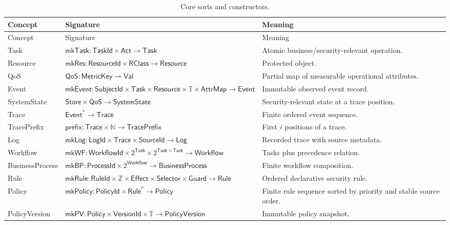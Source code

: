 \documentclass[11pt]{article}
\theoremstyle{remark}
\newcommand{\Nat}{\mathbb{N}}
\begin{document}
\begin{longtable}{>{\raggedright\arraybackslash}p{2.6cm} p{4.2cm} p{6.5cm}}
\caption{Core sorts and constructors.}\label{tab:sorts}\\
\toprule
Concept & Signature & Meaning \\
\midrule
\endfirsthead
\toprule
Concept & Signature & Meaning \\
\midrule
\endhead
Task & $\mathsf{mkTask}:\mathsf{TaskId}\times\mathsf{Act}\to\mathsf{Task}$ & Atomic business/security-relevant operation.\\
Resource & $\mathsf{mkRes}:\mathsf{ResourceId}\times\mathsf{RClass}\to\mathsf{Resource}$ & Protected object.\\
QoS & $\mathsf{QoS}:\mathsf{MetricKey}\rightharpoonup\mathsf{Val}$ & Partial map of measurable operational attributes.\\
Event & $\mathsf{mkEvent}:\mathsf{SubjectId}\times\mathsf{Task}\times\mathsf{Resource}\times\mathbb{T}\times\mathsf{AttrMap}\to\mathsf{Event}$ & Immutable observed event record.\\
SystemState & $\mathsf{Store}\times\mathsf{QoS}\to\mathsf{SystemState}$ & Security-relevant state at a trace position.\\
Trace & $\mathsf{Event}^{*}\to\mathsf{Trace}$ & Finite ordered event sequence.\\
TracePrefix & $\mathsf{prefix}:\mathsf{Trace}\times\Nat\to\mathsf{TracePrefix}$ & First $i$ positions of a trace.\\
Log & $\mathsf{mkLog}:\mathsf{LogId}\times\mathsf{Trace}\times\mathsf{SourceId}\to\mathsf{Log}$ & Recorded trace with source metadata.\\
Workflow & $\mathsf{mkWF}:\mathsf{WorkflowId}\times 2^{\mathsf{Task}}\times 2^{\mathsf{Task}\times\mathsf{Task}}\to\mathsf{Workflow}$ & Tasks plus precedence relation.\\
BusinessProcess & $\mathsf{mkBP}:\mathsf{ProcessId}\times 2^{\mathsf{Workflow}}\to\mathsf{BusinessProcess}$ & Finite workflow composition.\\
Rule & $\mathsf{mkRule}:\mathsf{RuleId}\times\mathbb{Z}\times\mathsf{Effect}\times\mathsf{Selector}\times\mathsf{Guard}\to\mathsf{Rule}$ & Ordered declarative security rule.\\
Policy & $\mathsf{mkPolicy}:\mathsf{PolicyId}\times\mathsf{Rule}^{*}\to\mathsf{Policy}$ & Finite rule sequence sorted by priority and stable source order.\\
PolicyVersion & $\mathsf{mkPV}:\mathsf{Policy}\times\mathsf{VersionId}\times\mathbb{T}\to\mathsf{PolicyVersion}$ & Immutable policy snapshot.\\

\end{longtable}
\end{document}
